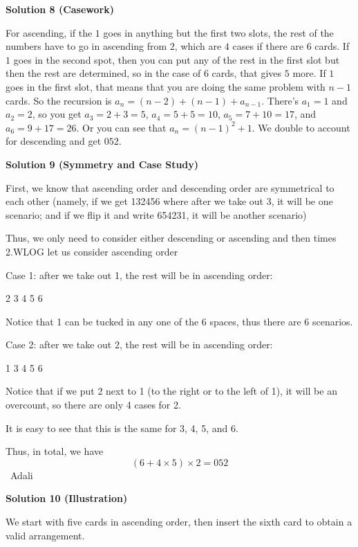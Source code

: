 \begin{enumerate}
 



\textbf{Solution 8 (Casework)}

For ascending, if the $1$ goes in anything but the first two slots, the rest of the numbers have to go in ascending from $2$, which are $4$ cases if there are $6$ cards. If $1$ goes in the second spot, then you can put any of the rest in the first slot but then the rest are determined, so in the case of $6$ cards, that gives $5$ more. If $1$ goes in the first slot, that means that you are doing the same problem with $n-1$ cards. So the recursion is $a_n=(n-2)+(n-1)+a_{n-1}$. There's $a_1=1$ and $a_2=2$, so you get $a_3=2+3=5$, $a_4=5+5=10$, $a_5=7+10=17$, and $a_6=9+17=26$. Or you can see that $a_n=(n-1)^2+1$. We double to account for descending and get $\boxed{052}$. 

 



\textbf{Solution 9 (Symmetry and Case Study)}

First, we know that ascending order and descending order are symmetrical to each other (namely, if we get 132456 where after we take out 3, it will be one scenario; and if we flip it and write 654231, it will be another scenario)

 Thus, we only need to consider either descending or ascending and then times 2.WLOG let us consider ascending order

 Case 1: after we take out 1, the rest will be in ascending order:

 2 3 4 5 6

 Notice that 1 can be tucked in any one of the 6 spaces, thus there are 6 scenarios.

 Case 2: after we take out 2, the rest will be in ascending order:

 1 3 4 5 6

 Notice that if we put 2 next to 1 (to the right or to the left of 1), it will be an overcount, so there are only 4 cases for 2.

 It is easy to see that this is the same for 3, 4, 5, and 6.

 Thus, in total, we have 
 \[(6+4\times5)\times2=\boxed{052}\]~Adali

 



\textbf{Solution 10 (Illustration)}

We start with five cards in ascending order, then insert the sixth card to obtain a valid arrangement.


\end{enumerate}

